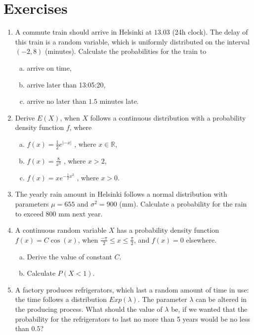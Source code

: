 \documentclass[12pt,a4paper,leqno]{report}
\theoremstyle{plain}
\theoremstyle{definition}
\begin{document}
\section{Exercises}
\begin{enumerate}
\item A commute train should arrive in Helsinki at $13.03$ (24h clock). The delay of this train is a random variable, which is uniformly distributed on the interval $(-2,8)$ (minutes). Calculate the probabilities for the train to
\begin{enumerate}[(a)]
\item arrive on time,
\item arrive later than 13:05:20,
\item arrive no later than $1.5$ minutes late.  
\end{enumerate}
\item Derive $E(X)$, when $X$ follows a continuous distribution with a probability density function $f$, where
\begin{enumerate}[(a)]
\item $f(x) = \frac{1}{2}e^{|-x|}$ \quad, where $x \in \mathbb{R}$,
\item $f(x) = \frac{8}{x^3}$ \quad, where $x > 2$,
\item $f(x) = xe^{-\frac{1}{2}x^2}$ \quad, where $x > 0$.
\end{enumerate}
\item The yearly rain amount in Helsinki follows a normal distribution with parameters $\mu = 655$ and $\sigma^2 = 900$ (mm). Calculate a probability for the rain to exceed $800$ mm next year.
\item A continuous random variable $X$ has a probability density function $f(x) = C \cos(x)$, when $\frac{-\pi}{2} \leq x \leq \frac{\pi}{2}$, and $f(x)=0$ elsewhere.
\begin{enumerate}[(a)]
\item Derive the value of constant $C$.
\item Calculate $P(X < 1)$.
\end{enumerate}
\item A factory produces refrigerators, which last a random amount of time in use: the time follows a distribution $Exp(\lambda)$. The parameter $\lambda$ can be altered in the producing process. What should the value of  $\lambda$ be, if we wanted that the probability for the refrigerators to last no more than 5 years would  be no less than $0.5$?
\end{enumerate}
\end{document}
